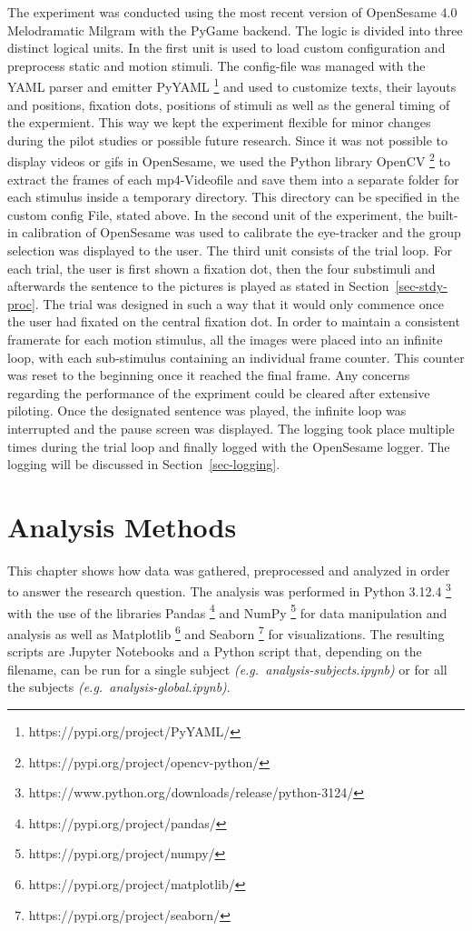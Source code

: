 \documentclass[
  12pt,
  letterpaper,
  DIV=11,
  numbers=noendperiod]{scrreprt}
\begin{document}
The experiment was conducted using the most recent version of OpenSesame
4.0 Melodramatic Milgram with the PyGame backend. The logic is divided
into three distinct logical units. In the first unit is used to load
custom configuration and preprocess static and motion stimuli. The
config-file was managed with the YAML parser and emitter PyYAML
\footnote{https://pypi.org/project/PyYAML/} and used to customize texts,
their layouts and positions, fixation dots, positions of stimuli as well
as the general timing of the expermient. This way we kept the experiment
flexible for minor changes during the pilot studies or possible future
research. Since it was not possible to display videos or gifs in
OpenSesame, we used the Python library OpenCV \footnote{https://pypi.org/project/opencv-python/}
to extract the frames of each mp4-Videofile and save them into a
separate folder for each stimulus inside a temporary directory. This
directory can be specified in the custom config File, stated above. In
the second unit of the experiment, the built-in calibration of
OpenSesame was used to calibrate the eye-tracker and the group selection
was displayed to the user. The third unit consists of the trial loop.
For each trial, the user is first shown a fixation dot, then the four
substimuli and afterwards the sentence to the pictures is played as
stated in Section~\ref{sec-stdy-proc}. The trial was designed in such a
way that it would only commence once the user had fixated on the central
fixation dot. In order to maintain a consistent framerate for each
motion stimulus, all the images were placed into an infinite loop, with
each sub-stimulus containing an individual frame counter. This counter
was reset to the beginning once it reached the final frame. Any concerns
regarding the performance of the expriment could be cleared after
extensive piloting. Once the designated sentence was played, the
infinite loop was interrupted and the pause screen was displayed. The
logging took place multiple times during the trial loop and finally
logged with the OpenSesame logger. The logging will be discussed in
Section~\ref{sec-logging}.

\chapter{Analysis Methods}\label{sec-analysis}

This chapter shows how data was gathered, preprocessed and analyzed in
order to answer the research question. The analysis was performed in
Python 3.12.4 \footnote{https://www.python.org/downloads/release/python-3124/}
with the use of the libraries Pandas \footnote{https://pypi.org/project/pandas/}
and NumPy \footnote{https://pypi.org/project/numpy/} for data
manipulation and analysis as well as Matplotlib \footnote{https://pypi.org/project/matplotlib/}
and Seaborn \footnote{https://pypi.org/project/seaborn/} for
visualizations. The resulting scripts are Jupyter Notebooks and a Python
script that, depending on the filename, can be run for a single subject
\emph{(e.g.~analysis-subjects.ipynb)} or for all the subjects
\emph{(e.g.~analysis-global.ipynb)}.
\end{document}
